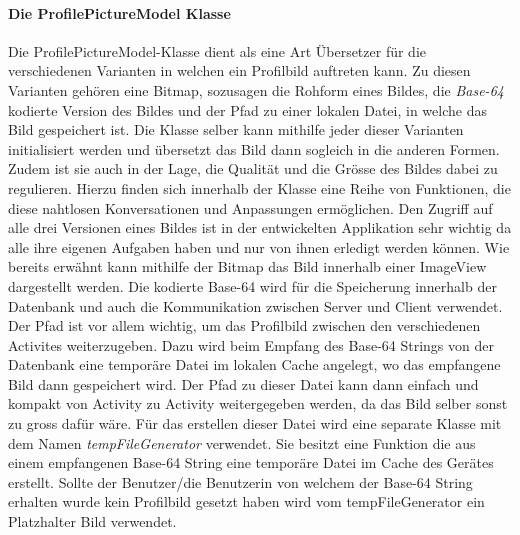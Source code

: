 \documentclass[a4paper,11pt]{report}
\begin{document}
				\paragraph{Die ProfilePictureModel Klasse}
				Die ProfilePictureModel-Klasse dient als eine Art Übersetzer für die verschiedenen Varianten in welchen ein Profilbild auftreten kann. Zu diesen Varianten gehören eine Bitmap, sozusagen die Rohform eines Bildes, die \emph{Base-64} kodierte Version des Bildes und der Pfad zu einer lokalen Datei, in welche das Bild gespeichert ist. Die Klasse selber kann mithilfe jeder dieser Varianten initialisiert werden und \glqq übersetzt\grqq{} das Bild dann sogleich in die anderen Formen. Zudem ist sie auch in der Lage, die Qualität und die Grösse des Bildes dabei zu regulieren. Hierzu finden sich innerhalb der Klasse eine Reihe von Funktionen, die diese nahtlosen Konversationen und Anpassungen ermöglichen. Den Zugriff auf alle drei Versionen eines Bildes ist in der entwickelten Applikation sehr wichtig da alle ihre eigenen Aufgaben haben und nur von ihnen erledigt werden können. Wie bereits erwähnt kann mithilfe der Bitmap das Bild innerhalb einer ImageView dargestellt werden. Die kodierte Base-64 wird für die Speicherung innerhalb der Datenbank und auch die Kommunikation zwischen Server und Client verwendet. Der Pfad ist vor allem wichtig, um das Profilbild zwischen den verschiedenen Activites weiterzugeben. Dazu wird beim Empfang des Base-64 Strings von der Datenbank eine temporäre Datei im lokalen Cache angelegt, wo das empfangene Bild dann gespeichert wird. Der Pfad zu dieser Datei kann dann einfach und kompakt von Activity zu Activity weitergegeben werden, da das Bild selber sonst zu gross dafür wäre. Für das erstellen dieser Datei wird eine separate Klasse mit dem Namen \emph{tempFileGenerator} verwendet. Sie besitzt eine Funktion die aus einem empfangenen Base-64 String eine temporäre Datei im Cache des Gerätes erstellt. Sollte der Benutzer/die Benutzerin von welchem der Base-64 String erhalten wurde kein Profilbild gesetzt haben wird vom tempFileGenerator ein Platzhalter Bild verwendet.
	
\end{document}
